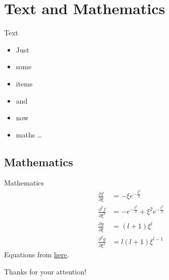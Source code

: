 \section{Text and Mathematics}
\begin{frame}{Text}
	\begin{itemize}
		\item Just
		\item some
		\item items
		\item and
		\item now
		\item maths \dots
	\end{itemize}
\end{frame}


\subsection[Maths]{Mathematics}
\begin{frame}{Mathematics}
	\begin{align}
     \frac{\partial f}{\partial \xi} &= - \xi e^{-\frac{\xi^2}{2}} \\
     \frac{\partial^2 f}{\partial \xi^2} &= - e^{-\frac{\xi^2}{2}}+ \xi^2 e^{-\frac{\xi^2}{2}} \\
     \frac{\partial g}{\partial \xi} &= (l+1) \xi^l \\
     \frac{\partial^2 g}{\partial \xi^2} &= l(l+1)\xi^{l-1} 
 \end{align}
 {\footnotesize Equations from \href{https://de.wikibooks.org/wiki/LaTeX-W\%C3\%B6rterbuch:\_align}{here}.}
\end{frame}


\begin{frame}{Thanks for your attention!}
	\printbibliography
\end{frame}
